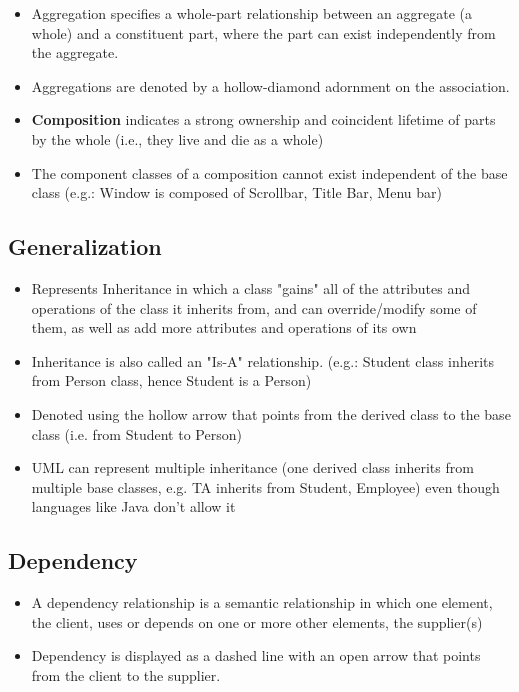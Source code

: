 \documentclass{article}
\begin{document}
\begin{itemize}
\begin{itemize}
        \item Aggregation specifies a whole-part relationship between an aggregate (a whole) and a constituent part, where the part can exist independently from the aggregate.
        
        \item Aggregations are denoted by a hollow-diamond adornment on the association.
        
        \item \textbf{Composition} indicates a strong ownership and coincident lifetime of parts by the whole (i.e., they live and die as a whole)
        
        \item The component classes of a composition cannot exist independent of the base class (e.g.: Window is composed of Scrollbar, Title Bar, Menu bar)
    \end{itemize}
\end{itemize}

\subsection{Generalization}
\begin{itemize}
    \item Represents Inheritance in which a class "gains" all of the attributes and operations of the class it inherits from, and can override/modify some of them, as well as add more attributes and operations of its own
    
    \item Inheritance is also called an "Is-A" relationship. (e.g.: Student class inherits from Person class, hence Student is a Person)
    
    \item Denoted using the hollow arrow that points from the derived class to the base class (i.e. from Student to Person)
    
    \item UML can represent multiple inheritance (one derived class inherits from multiple base classes, e.g. TA inherits from Student, Employee) even though languages like Java don't allow it
\end{itemize}

\subsection{Dependency}
\begin{itemize}
    \item A dependency relationship is a semantic relationship in which one element, the client, uses or depends on one or more other elements, the supplier(s)
    
    \item Dependency is displayed as a dashed line with an open arrow that points from the client to the supplier. 
\end{itemize}
\end{document}
